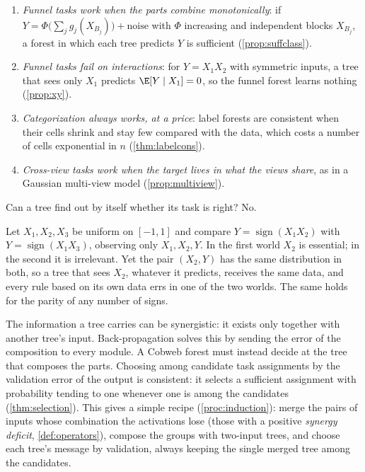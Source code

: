\begin{proposition}\label{prop:main-tasks}
\leavevmode
\begin{enumerate}[label=(\alph*),leftmargin=*,noitemsep]
\item \emph{Funnel tasks work when the parts combine monotonically}: if
  $Y=\Phi\bigl(\sum_jg_j(X_{B_j})\bigr)+\text{noise}$ with $\Phi$ increasing and
  independent blocks $X_{B_j}$, a forest in which each tree predicts $Y$ is sufficient
  (\cref{prop:suffclass}).
\item \emph{Funnel tasks fail on interactions}: for $Y=X_1X_2$ with symmetric inputs, a
  tree that sees only $X_1$ predicts $\E[Y\mid X_1]=0$, so the funnel forest learns
  nothing (\cref{prop:xy}).
\item \emph{Categorization always works, at a price}: label forests are consistent when
  their cells shrink and stay few compared with the data, which costs a number of cells
  exponential in $n$ (\cref{thm:labelcons}).
\item \emph{Cross-view tasks work when the target lives in what the views share}, as in a
  Gaussian multi-view model (\cref{prop:multiview}).
\end{enumerate}
\end{proposition}

Can a tree find out by itself whether its task is right?  No.

\begin{proposition}\label{prop:main-local}
Let $X_1,X_2,X_3$ be uniform on $[-1,1]$ and compare $Y=\operatorname{sign}(X_1X_2)$ with
$Y=\operatorname{sign}(X_1X_3)$, observing only $X_1,X_2,Y$.  In the first world $X_2$
is essential; in the second it is irrelevant.  Yet the pair $(X_2,Y)$ has the same
distribution in both, so a tree that sees $X_2$, whatever it predicts, receives the same
data, and every rule based on its own data errs in one of the two worlds.  The same holds
for the parity of any number of signs.
\end{proposition}

The information a tree carries can be synergistic: it exists only together with another
tree's input.  Back-propagation solves this by sending the error of the composition to
every module.  A Cobweb forest must instead decide at the tree that composes the parts.
Choosing among candidate task assignments by the validation error of the output is
consistent: it selects a sufficient assignment with probability tending to one whenever
one is among the candidates (\cref{thm:selection}).  This gives a simple recipe
(\cref{proc:induction}): merge the pairs of inputs whose combination the activations lose
(those with a positive \emph{synergy deficit}, \cref{def:operators}), compose the groups
with two-input trees, and choose each tree's message by validation, always keeping the
single merged tree among the candidates.

